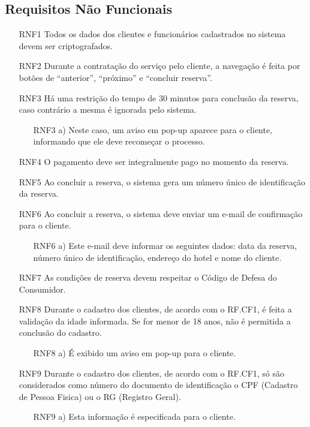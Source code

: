 \documentclass[notitlepage]{article}
\begin{document}
\subsection{Requisitos Não Funcionais}
\begin{enumerate}
	\item[RNF1 ] Todos os dados dos clientes e funcionários cadastrados no sistema devem ser criptografados.
	\item[RNF2 ] Durante a contratação do serviço pelo cliente, a navegação é feita por botões de “anterior”, “próximo” e “concluir reserva”.
	\item[RNF3 ] Há uma restrição do tempo de 30 minutos para conclusão da reserva, caso contrário a mesma é ignorada pelo sistema.
	\begin{enumerate}
	\item[RNF3 a) ] Neste caso, um aviso em pop-up aparece para o cliente, informando que ele deve recomeçar o processo.
	\end{enumerate}
	\item[RNF4 ] O pagamento deve ser integralmente pago no momento da reserva.
	\item[RNF5 ] Ao concluir a reserva, o sistema gera um número único de identificação da reserva.
	\item[RNF6 ] Ao concluir a reserva, o sistema deve enviar um e-mail de confirmação para o cliente.
	\begin{enumerate}
	\item[RNF6 a) ] Este e-mail deve informar os seguintes dados: data da reserva, número único de identificação, endereço do hotel e nome do cliente.
	\end{enumerate}	 
	\item[RNF7 ] As condições de reserva devem respeitar o Código de Defesa do Consumidor.
	\item[RNF8 ] Durante o cadastro dos clientes, de acordo com o RF.CF1, é feita a validação da idade informada. Se for menor de 18 anos, não é permitida a conclusão do cadastro.
	\begin{enumerate}
	\item[RNF8 a) ] É exibido um aviso em pop-up para o cliente.	
	\end{enumerate}	 	
	\item[RNF9 ] Durante o cadastro dos clientes, de acordo com o RF.CF1, só são considerados como número do documento de identificação o CPF (Cadastro de Pessoa Fisica) ou o RG (Registro Geral).
	\begin{enumerate}
	\item[RNF9 a) ] Esta informação é especificada para o cliente.	

\end{enumerate}
\end{enumerate}
\end{document}
